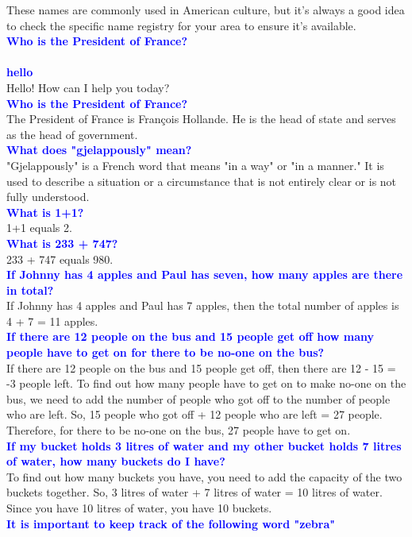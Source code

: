 These names are commonly used in American culture, but it's always a good idea to check the specific name registry for your area to ensure it's available.\\\textcolor{blue}{\textbf{Who is the President of France?}}\\\\\textcolor{blue}{\textbf{hello}}\\
Hello! How can I help you today?\\\textcolor{blue}{\textbf{Who is the President of France?}}\\
The President of France is François Hollande. He is the head of state and serves as the head of government.\\\textcolor{blue}{\textbf{What does "gjelappously" mean?}}\\
"Gjelappously" is a French word that means "in a way" or "in a manner." It is used to describe a situation or a circumstance that is not entirely clear or is not fully understood.\\\textcolor{blue}{\textbf{What is 1+1?}}\\
1+1 equals 2.\\\textcolor{blue}{\textbf{What is 233 + 747?}}\\
233 + 747 equals 980.\\\textcolor{blue}{\textbf{If Johnny has 4 apples and Paul has seven, how many apples are there in total?}}\\
If Johnny has 4 apples and Paul has 7 apples, then the total number of apples is 4 + 7 = 11 apples.\\\textcolor{blue}{\textbf{If there are 12 people on the bus and 15 people get off how many people have to get on for there to be no-one on the bus?}}\\
If there are 12 people on the bus and 15 people get off, then there are 12 - 15 = -3 people left.
To find out how many people have to get on to make no-one on the bus, we need to add the number of people who got off to the number of people who are left.
So, 15 people who got off + 12 people who are left = 27 people.
Therefore, for there to be no-one on the bus, 27 people have to get on.\\\textcolor{blue}{\textbf{If my bucket holds 3 litres of water and my other bucket holds 7 litres of water, how many buckets do I have?}}\\
To find out how many buckets you have, you need to add the capacity of the two buckets together.
So, 3 litres of water + 7 litres of water = 10 litres of water.
Since you have 10 litres of water, you have 10 buckets.\\\textcolor{blue}{\textbf{It is important to keep track of the following word "zebra"}}\\
